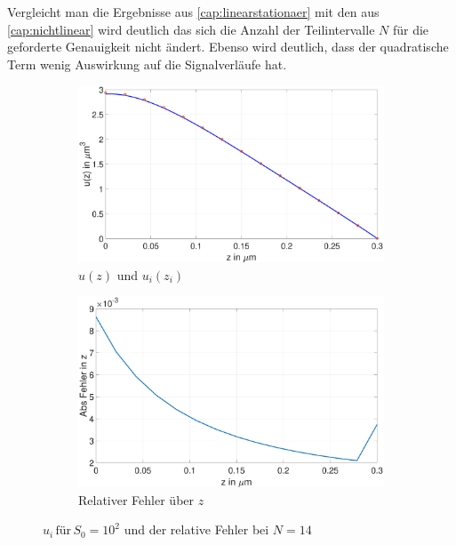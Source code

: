Vergleicht man die Ergebnisse aus \cref{cap:linearstationaer} mit den aus \cref{cap:nichtlinear} wird deutlich das sich die Anzahl der Teilintervalle $N$ für die geforderte Genauigkeit nicht ändert. Ebenso wird deutlich, dass der quadratische Term wenig Auswirkung auf die Signalverläufe hat.  
\begin{figure}[h]
	\begin{subfigure}[b]{0.5\textwidth}
		\includegraphics[width=\textwidth]{figures/station_gl_2_2/S0}
		\caption{$u(z)$ und $u_{i}(z_i)$}
	\end{subfigure}
	\hfill
	\begin{subfigure}[b]{0.5\textwidth}
		\includegraphics[width=1\linewidth]{figures/station_gl_2_2/S0_fehler}
		\caption{Relativer Fehler über $z$}
	\end{subfigure}
	\caption{$u_i \,\text{für} \, S_0=10^2$ und der relative Fehler bei $N=14$ }
\end{figure}
